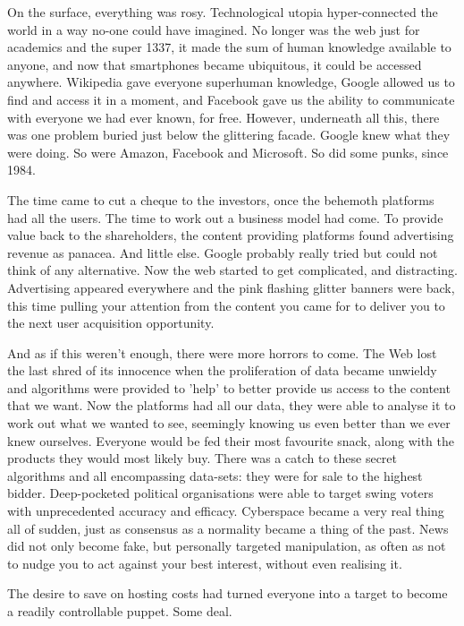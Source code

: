 On the surface, everything was rosy. Technological utopia hyper-connected the world in a way no-one could have imagined. No longer was the web just for academics and the super 1337, it made the sum of human knowledge available to anyone, and now that smartphones became ubiquitous, it could be accessed anywhere. Wikipedia gave everyone superhuman knowledge, Google allowed us to find and access it in a moment, and Facebook gave us the ability to communicate with everyone we had ever known, for free. However, underneath all this, there was one problem buried just below the glittering facade. Google knew what they were doing. So were Amazon, Facebook and Microsoft. So did some punks, since 1984.

The time came to cut a cheque to the investors, once the behemoth platforms had all the users. The time to work out a business model had come. To provide value back to the shareholders, the content providing platforms found advertising revenue as panacea. And little else. Google probably really tried but could not think of any alternative. Now the web started to get complicated, and distracting. Advertising appeared everywhere and the pink flashing glitter banners were back, this time pulling your attention from the content you came for to deliver you to the next user acquisition opportunity.

And as if this weren't enough, there were more horrors to come. The Web lost the last shred of its innocence when the proliferation of data became unwieldy and algorithms were provided to 'help' to better provide us access to the content that we want. Now the platforms had all our data, they were able to analyse it to work out what we wanted to see, seemingly knowing us even better than we ever knew ourselves. Everyone would be fed their most favourite snack, along with the products they would most likely buy. There was a catch to these secret algorithms and all encompassing data-sets: they were for sale to the highest bidder. Deep-pocketed political organisations were able to target swing voters with unprecedented accuracy and efficacy. Cyberspace became a very real thing all of sudden, just as consensus as a normality became a thing of the past. News did not only become fake, but personally targeted manipulation, as often as not to nudge you to act against your best interest, without even realising it.

The desire to save on hosting costs had turned everyone into a target to become a readily controllable puppet. Some deal.

